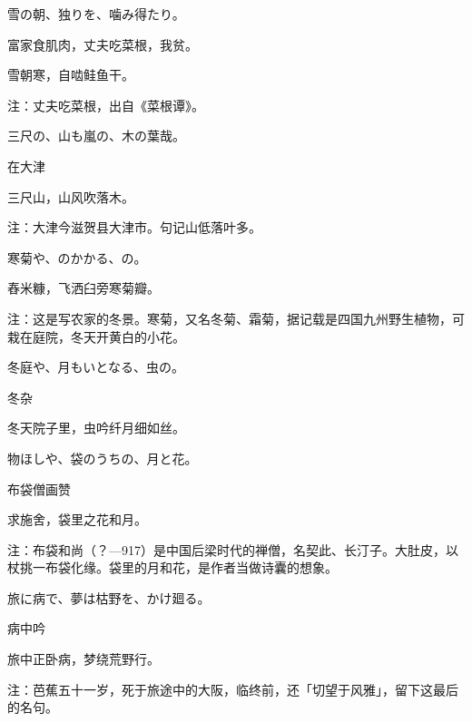 \begin{haiku}
    {\FH 雪の朝、独りを、噛み得たり。}

    {\FK 富家食肌肉，丈夫吃菜根，我贫。}

    {\FK 雪朝寒，自啮鲑鱼干。}

    {\FT 注：丈夫吃菜根，出自《菜根谭》。}
\end{haiku}

\begin{haiku}
    {\FH 三尺の、山も嵐の、木の葉哉。}

    {\FK 在大津}

    {\FK 三尺山，山风吹落木。}

    {\FT 注：大津今滋贺县大津市。句记山低落叶多。}
\end{haiku}

\begin{haiku}
    {\FH 寒菊や、のかかる、の。}

    {\FK 舂米糠，飞洒臼旁寒菊瓣。}

    {\FT 注：这是写农家的冬景。寒菊，又名冬菊、霜菊，据记载是四国九州野生植物，可栽在庭院，冬天开黄白的小花。}
\end{haiku}

\begin{haiku}
    {\FH 冬庭や、月もいとなる、虫の。}

    {\FK 冬杂}

    {\FK 冬天院子里，虫吟纤月细如丝。}
\end{haiku}

\begin{haiku}
    {\FH 物ほしや、袋のうちの、月と花。}

    {\FK 布袋僧画赞}

    {\FK 求施舍，袋里之花和月。}

    {\FT 注：布袋和尚（？—917）是中国后梁时代的禅僧，名契此、长汀子。大肚皮，以杖挑一布袋化缘。袋里的月和花，是作者当做诗囊的想象。}
\end{haiku}

\begin{haiku}
    {\FH 旅に病で、夢は枯野を、かけ廻る。}

    {\FK 病中吟}

    {\FK 旅中正卧病，梦绕荒野行。}

    {\FT 注：芭蕉五十一岁，死于旅途中的大阪，临终前，还「切望于风雅」，留下这最后的名句。}
\end{haiku}

